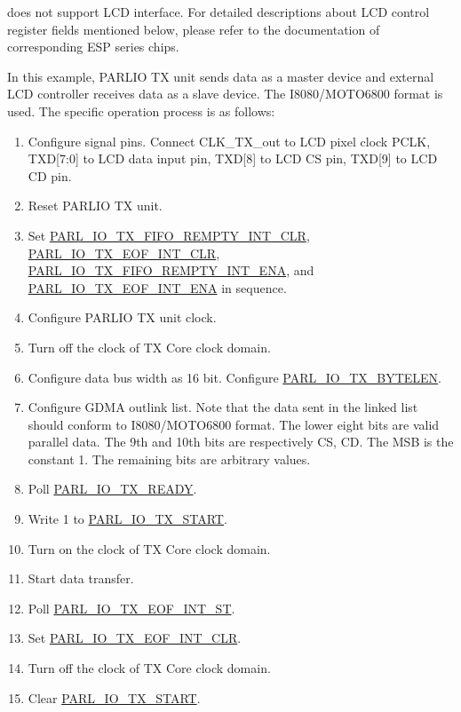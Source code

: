 \documentclass[main\_\_EN.tex]{subfiles}
\begin{document}
\vspace{1em}
\begin{tiplisting}
    \chipname{} does not support LCD interface. For detailed descriptions about LCD control register fields mentioned below, please refer to the documentation of corresponding ESP series chips.
\end{tiplisting}
\vspace{-1em}

In this example, PARLIO TX unit sends data as a master device and external LCD controller receives data as a slave device. The I8080/MOTO6800 format is used. The specific operation process is as follows:

\begin{enumerate}
    \item Configure signal pins. Connect CLK\_TX\_out to LCD pixel clock PCLK, TXD[7:0] to LCD data input pin, TXD[8] to LCD CS pin, TXD[9] to LCD CD pin.
    \item Reset PARLIO TX unit.
    \item Set \hyperref[fielddesc:PARLIOTXFIFOREMPTYINTCLR]{PARL\_IO\_TX\_FIFO\_REMPTY\_INT\_CLR}, \hyperref[fielddesc:PARLIOTXEOFINTCLR]{PARL\_IO\_TX\_EOF\_INT\_CLR}, \hyperref[fielddesc:PARLIOTXFIFOREMPTYINTENA]{PARL\_IO\_TX\_FIFO\_REMPTY\_INT\_ENA}, and \hyperref[fielddesc:PARLIOTXEOFINTENA]{PARL\_IO\_TX\_EOF\_INT\_ENA} in sequence. 
    \item Configure PARLIO TX unit clock.
    \item Turn off the clock of TX Core clock domain.
    \item Configure data bus width as 16 bit. Configure \hyperref[fielddesc:PARLIOTXBYTELEN]{PARL\_IO\_TX\_BYTELEN}.
    \item Configure GDMA outlink list. Note that the data sent in the linked list should conform to I8080/MOTO6800 format. The lower eight bits are valid parallel data. The 9th and 10th bits are respectively CS, CD. The MSB is the constant 1. The remaining bits are arbitrary values.
    \item Poll \hyperref[fielddesc:PARLIOTXREADY]{PARL\_IO\_TX\_READY}.
    \item Write 1 to \hyperref[fielddesc:PARLIOTXSTART]{PARL\_IO\_TX\_START}.
    \item Turn on the clock of TX Core clock domain.
    \item Start data transfer.
    \item Poll \hyperref[fielddesc:PARLIOTXEOFINTST]{PARL\_IO\_TX\_EOF\_INT\_ST}.
    \item Set \hyperref[fielddesc:PARLIOTXEOFINTCLR]{PARL\_IO\_TX\_EOF\_INT\_CLR}.
    \item Turn off the clock of TX Core clock domain.
    \item Clear \hyperref[fielddesc:PARLIOTXSTART]{PARL\_IO\_TX\_START}. 
\end{enumerate}
\end{document}
